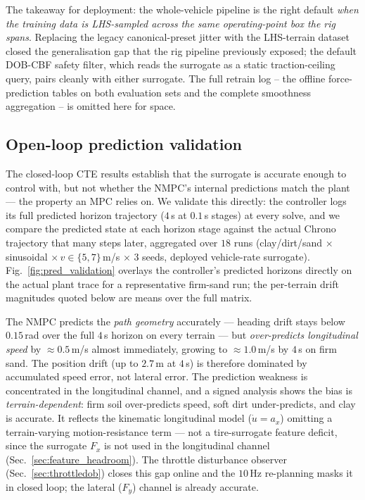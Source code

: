 \documentclass[conference,letterpaper,10pt]{IEEEtran}
\begin{document}
The takeaway for deployment: the whole-vehicle pipeline is the right
default \emph{when the training data is LHS-sampled across the same
operating-point box the rig spans}. Replacing the legacy
canonical-preset jitter with the LHS-terrain dataset closed the
generalisation gap that the rig pipeline previously exposed; the
default DOB-CBF safety filter, which reads the surrogate as a static
traction-ceiling query, pairs cleanly with either surrogate. The full
retrain log -- the offline force-prediction tables on both evaluation
sets and the complete smoothness aggregation -- is omitted here for
space.

\subsection{Open-loop prediction validation}
\label{sec:pred_validation}
The closed-loop CTE results establish that the surrogate is accurate
enough to control with, but not whether the NMPC's internal predictions
match the plant --- the property an MPC relies on. We validate
this directly: the controller logs its full predicted horizon trajectory
($4\,$s at $0.1\,$s stages) at every solve, and we compare the predicted
state at each horizon stage against the actual Chrono trajectory that
many steps later, aggregated over $18$ runs (clay/dirt/sand $\times$
sinusoidal $\times\,v\!\in\!\{5,7\}\,$m/s $\times$ 3 seeds, deployed
vehicle-rate surrogate). Fig.~\ref{fig:pred_validation} overlays the
controller's predicted horizons directly on the actual plant trace for a
representative firm-sand run; the per-terrain drift magnitudes quoted
below are means over the full matrix.

The NMPC predicts the \emph{path geometry} accurately --- heading drift
stays below $0.15\,$rad over the full $4\,$s horizon on every terrain ---
but \emph{over-predicts longitudinal speed} by ${\approx}0.5\,$m/s almost
immediately, growing to ${\approx}1.0\,$m/s by $4\,$s on firm sand. The
position drift (up to $2.7\,$m at $4\,$s) is therefore dominated by
accumulated speed error, not lateral error. The prediction weakness is
concentrated in the longitudinal channel, and a signed analysis shows
the bias is \emph{terrain-dependent}: firm soil over-predicts speed,
soft dirt under-predicts, and clay is accurate. It reflects the
kinematic longitudinal model ($\dot u\!=\!a_x$) omitting a
terrain-varying motion-resistance term --- not a tire-surrogate feature
deficit, since the surrogate $F_x$ is not used in the longitudinal
channel (Sec.~\ref{sec:feature_headroom}). The throttle disturbance
observer (Sec.~\ref{sec:throttledob}) closes this gap online and the
$10\,$Hz re-planning masks it in closed loop; the lateral ($F_y$)
channel is already accurate.
\end{document}
